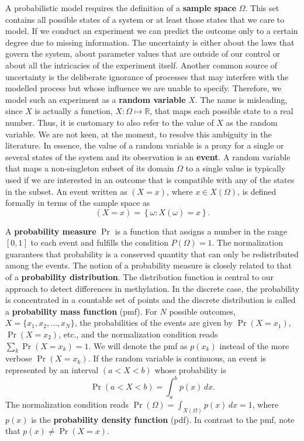 \documentclass[a4paper]{article}
\begin{document}
A probabilistic model requires the definition of a \textbf{sample
  space} $\Omega$. This set contains all possible states of a system
or at least those states that we care to model. If we conduct an
experiment we can predict the outcome only to a certain degree due to
missing information. The uncertainty is either about the laws that
govern the system, about parameter values that are outside of our
control or about all the intricacies of the experiment itself. Another
common source of uncertainty is the deliberate ignorance of processes
that may interfere with the modelled process but whose influence we
are unable to specify. Therefore, we model such an experiment as a
\textbf{random variable} $X$. The name is misleading, since $X$ is
actually a function, $X: \Omega \longmapsto \mathbb{R}$, that maps
each possible state to a real number. Thus, it is customary to also
refer to the value of $X$ as the random variable. We are not keen, at
the moment, to resolve this ambiguity in the literature. In essence,
the value of a random variable is a proxy for a single or several
states of the system and its observation is an \textbf{event}. A
random variable that maps a non-singleton subset of its domain
$\Omega$ to a single value is typically used if we are interested in
an outcome that is compatible with any of the states in the subset. An
event written as $(X=x)$, where $x \in X(\Omega)$, is defined formally
in terms of the sample space as
\begin{equation}
  \label{eq:randevent}
  \left( X=x \right) = \left\{ \omega: X(\omega)=x \right\}.
\end{equation}

A \textbf{probability measure} $\Pr$ is a function that assigns a
number in the range $[0, 1]$ to each event and fulfills the condition
$P(\Omega)=1$. The normalization guarantees that probability is a
conserved quantity that can only be redistributed among the events.
The notion of a probability measure is closely related to that of a
\textbf{probability distribution}. The distribution function is
central to our approach to detect differences in methylation. In the
discrete case, the probability is concentrated in a countable set of
points and the discrete distribution is called a \textbf{probability
  mass function} (pmf). For $N$ possible outcomes, $X=\{ x_1, x_2,
\ldots, x_N \}$, the probabilities of the events are given by
$\Pr(X=x_1)$, $\Pr(X=x_2)$, etc., and the normalization condition
reads $\sum_k \Pr(X=x_k) = 1$. We will denote the pmf as $p(x_k)$
instead of the more verbose $\Pr(X=x_k)$. If the random variable is
continuous, an event is represented by an interval $(a < X < b)$ whose
probability is
\begin{equation}
\Pr(a < X < b) = \int_a^b p(x)\,dx.
\end{equation}
The normalization condition reads $\Pr(\Omega)=\int_{X(\Omega)}
p(x)\,dx = 1$, where $p(x)$ is the \textbf{probability density
  function} (pdf). In contrast to the pmf, note that $p(x) \neq
\Pr(X=x)$.
\end{document}

